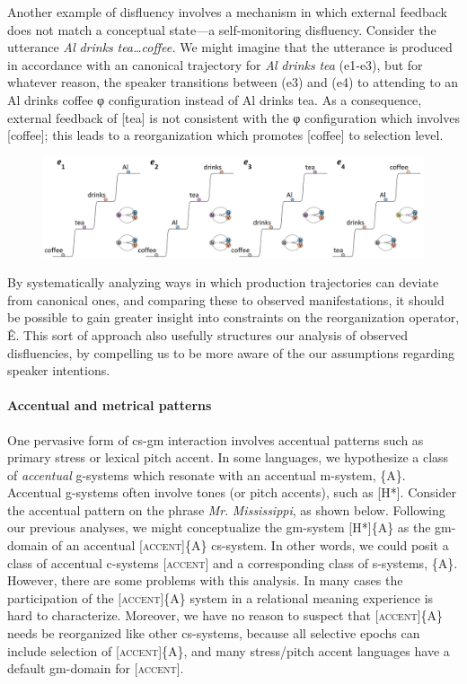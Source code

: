   Another example of disfluency involves a mechanism in which external feedback does not match a conceptual state—a self-monitoring disfluency. Consider the utterance \textit{Al} \textit{drinks} \textit{tea…coffee.} We might imagine that the utterance is produced in accordance with an canonical trajectory for \textit{Al} \textit{drinks} \textit{tea} (e1-e3), but for whatever reason, the speaker transitions between (e3) and (e4) to attending to an {\textbar}Al drinks coffee{\textbar} φ configuration instead of {\textbar}Al drinks tea{\textbar}. As a consequence, external feedback of [tea] is not consistent with the φ configuration which involves [coffee]; this leads to a reorganization which promotes [coffee] to selection level.

  
\begin{figure}
\includegraphics[width=\textwidth]{figures/Tilsen-img62.png}
\caption{\missingcaption}
\label{fig:}
\end{figure}
 

  By systematically analyzing ways in which production trajectories can deviate from canonical ones, and comparing these to observed manifestations, it should be possible to gain greater insight into constraints on the reorganization operator, Ê. This sort of approach also usefully structures our analysis of observed disfluencies, by compelling us to be more aware of the our assumptions regarding speaker intentions.

\paragraph{Accentual and metrical patterns}

One pervasive form of cs-gm interaction involves accentual patterns such as primary stress or lexical pitch accent. In some languages, we hypothesize a class of \textit{accentual} g-systems which resonate with an accentual m-system, \{A\}. Accentual g-systems often involve tones (or pitch accents), such as [H*]. Consider the accentual pattern on the phrase \textit{Mr}. \textit{Mississippi}, as shown below. Following our previous analyses, we might conceptualize the gm-system [H*]\{A\} as the gm-domain of an accentual [\textsc{accent}]\{A\} cs-system. In other words, we could posit a class of accentual c-systems [\textsc{accent}] and a corresponding class of s-systems, \{A\}. However, there are some problems with this analysis. In many cases the participation of the [\textsc{accent}]\{A\} system in a relational meaning experience is hard to characterize. Moreover, we have no reason to suspect that [\textsc{accent}]\{A\} needs be reorganized like other cs-systems, because all selective epochs can include selection of [\textsc{accent}]\{A\}, and many stress/pitch accent languages have a default gm-domain for [\textsc{accent}].

